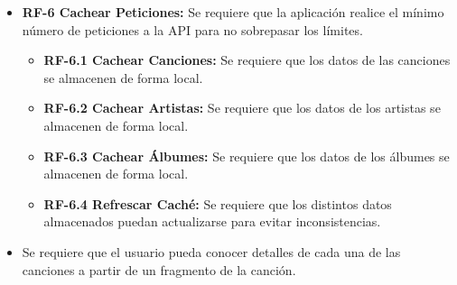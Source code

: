 \begin{itemize}
    \item
        \textbf{RF-6 Cachear Peticiones:} Se requiere que la aplicación realice el mínimo número de peticiones a la API para no sobrepasar los límites.
            \begin{itemize}
                \item \textbf{RF-6.1 Cachear Canciones:} Se requiere que los datos de las canciones se almacenen de forma local.
                \item \textbf{RF-6.2 Cachear Artistas:} Se requiere que los datos de los artistas se almacenen de forma local.
                \item \textbf{RF-6.3 Cachear Álbumes:} Se requiere que los datos de los álbumes se almacenen de forma local.
                \item \textbf{RF-6.4 Refrescar Caché:} Se requiere que los distintos datos almacenados puedan actualizarse para evitar inconsistencias.
            \end{itemize}
    \item
         Se requiere que el usuario pueda conocer detalles de cada una de las canciones a partir de un fragmento de la canción.
    
    
\end{itemize}

